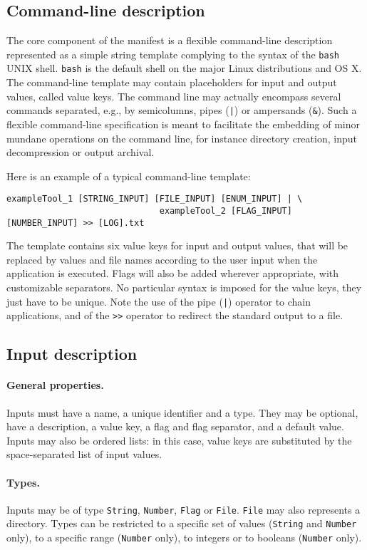 \documentclass{article}
\begin{document}
\subsection{Command-line description}

The core component of the manifest is a flexible command-line
description represented as a simple string template complying to the
syntax of the \texttt{bash} UNIX shell. \texttt{bash} is the default
shell on the major Linux distributions and OS X. The command-line
template may contain placeholders for input and output values, called
value keys. The command line may actually
encompass several commands separated, e.g., by semicolumns, pipes
(\texttt{|}) or ampersands (\texttt{\&}). Such a flexible command-line
specification is meant to facilitate the embedding of minor mundane
operations on the command line, for instance directory creation, input
decompression or output archival.

Here is an example of a typical command-line template:
\begin{verbatim}
exampleTool_1 [STRING_INPUT] [FILE_INPUT] [ENUM_INPUT] | \
                              exampleTool_2 [FLAG_INPUT] [NUMBER_INPUT] >> [LOG].txt
\end{verbatim}
The template contains six value keys for input and output values, that
will be replaced by values and file names according to the user input
when the application is executed. Flags will also be added wherever
appropriate, with customizable separators. No particular syntax is
imposed for the value keys, they just have to be unique.  Note the use
of the pipe (\texttt{|}) operator to chain applications, and of the
\texttt{>>} operator to redirect the standard output to a file.

\subsection{Input description}

\paragraph{General properties.} Inputs must have a name, a unique
identifier and a type. They may be optional, have a description, a
value key, a flag and flag separator, and a default value. Inputs may
also be ordered lists: in this case, value keys are substituted by the
space-separated list of input values.

\paragraph{Types.} Inputs may be of type \texttt{String},
\texttt{Number}, \texttt{Flag} or \texttt{File}. \texttt{File} may
also represents a directory. Types can be restricted to a specific set
of values (\texttt{String} and \texttt{Number} only), to a specific
range (\texttt{Number} only), to integers or to booleans (\texttt{Number}
only).
\end{document}
